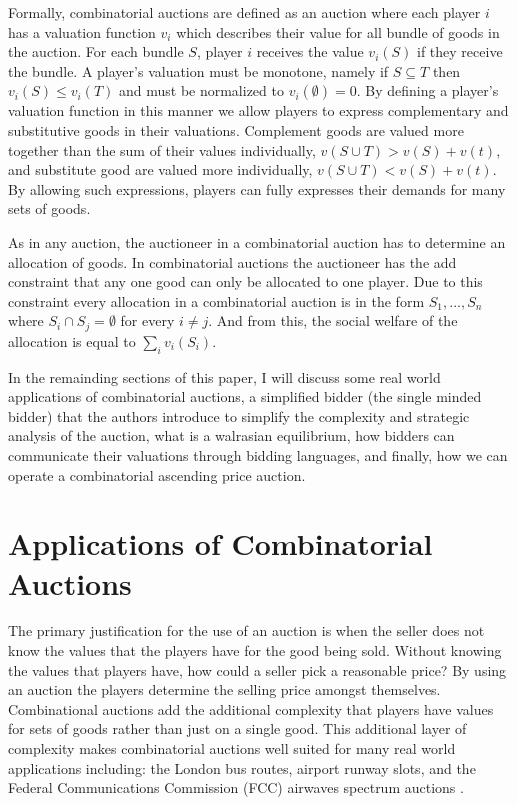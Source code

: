 \documentclass[10pt,onecolumn,letterpaper]{article}
\theoremstyle{definition}
\begin{document}
Formally, combinatorial auctions are defined as an auction where each player $i$ has a valuation function $v_i$ which describes their value for all bundle of goods in the auction. For each bundle $S$, player $i$ receives the value $v_i(S)$ if they receive the bundle. A player's valuation must be monotone, namely if $S \subseteq T$ then $v_i(S) \leq v_i(T)$ and must be normalized to $v_i(\emptyset)= 0$. By defining a player's valuation function in this manner we allow players to express complementary and substitutive goods in their valuations. Complement goods are valued more together than the sum of their values individually, $v(S \cup T) > v(S) + v(t)$, and substitute good are valued more individually, $v(S \cup T) < v(S) + v(t)$. By allowing such expressions, players can fully expresses their demands for many sets of goods.

As in any auction, the auctioneer in a combinatorial auction has to determine an allocation of goods. In combinatorial auctions the auctioneer has the add constraint that any one good can only be allocated to one player. Due to this constraint every allocation in a combinatorial auction is in the form $S_1,...,S_n$ where $S_i \cap S_j = \emptyset$ for every $i \neq j$. And from this, the social welfare of the allocation is equal to $\sum_i v_i(S_i)$.

In the remainding sections of this paper, I will discuss some real world applications of combinatorial auctions, a simplified bidder (the single minded bidder) that the authors introduce to simplify the complexity and strategic analysis of the auction, what is a walrasian equilibrium, how bidders can communicate their valuations through bidding languages, and finally, how we can operate a combinatorial ascending price auction.

\section{Applications of Combinatorial Auctions}

The primary justification for the use of an auction is when the seller does not know the values that the players have for the good being sold. Without knowing the values that players have, how could a seller pick a reasonable price? By using an auction the players determine the selling price amongst themselves. Combinational auctions add the additional complexity that players have values for sets of goods rather than just on a single good. This additional layer of complexity makes combinatorial auctions well suited for many real world applications including: the London bus routes, airport runway slots, and the Federal Communications Commission (FCC) airwaves spectrum auctions \cite{real world}. 
\end{document}
